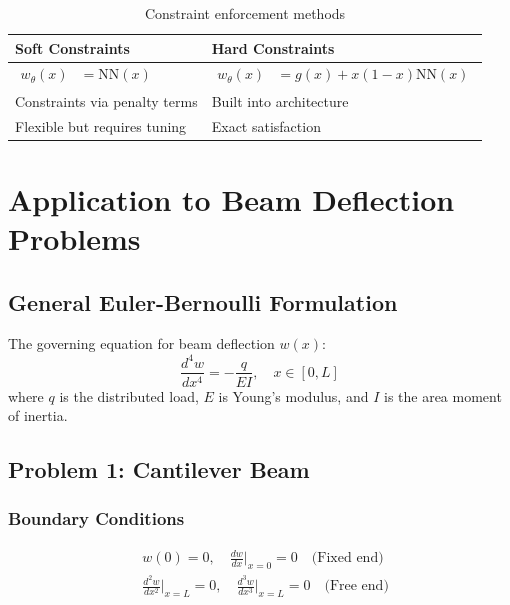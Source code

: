 \documentclass[12pt]{article}
\begin{document}
\begin{table}[htbp]
	\centering
	\begin{tabular}{p{}p{}}
		\toprule
		\textbf{Soft Constraints} & \textbf{Hard Constraints} \\
		\midrule
		$\begin{aligned}
			w_{\theta}(x) &= \text{NN}(x)
		\end{aligned}$ & $\begin{aligned}
			w_{\theta}(x) &= g(x) + x(1-x)\text{NN}(x)
		\end{aligned}$ \\
		Constraints via penalty terms & Built into architecture \\
		Flexible but requires tuning & Exact satisfaction \\
		\bottomrule
	\end{tabular}
	\caption{Constraint enforcement methods}
	\label{tab:constraints}
\end{table}

\section{Application to Beam Deflection Problems}
\subsection{General Euler-Bernoulli Formulation}
The governing equation for beam deflection $w(x)$:
\begin{equation}
	\frac{d^4 w}{dx^4} = -\frac{q}{EI}, \quad x \in [0,L]
	\label{eq:beam_pde}
\end{equation}
where $q$ is the distributed load, $E$ is Young's modulus, and $I$ is the area moment of inertia.

\subsection{Problem 1: Cantilever Beam}
\subsubsection{Boundary Conditions}
\begin{align}
	&w(0) = 0, \quad \frac{dw}{dx}\Big|_{x=0} = 0 \quad \text{(Fixed end)} \label{eq:cantilever_bc1} \\
	&\frac{d^2w}{dx^2}\Big|_{x=L} = 0, \quad \frac{d^3w}{dx^3}\Big|_{x=L} = 0 \quad \text{(Free end)} \label{eq:cantilever_bc2}
\end{align}
\end{document}
